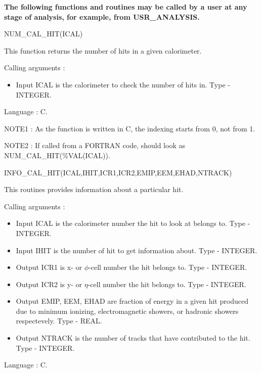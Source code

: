 \bigskip

{\bf The following functions and routines may be called by a user at any stage 
of analysis, for example, from USR\_ANALYSIS.}

\bigskip

\begin{center}
NUM\_CAL\_HIT(ICAL)
\end{center}

This function returns the number of hits in a given calorimeter. 

\newpage

Calling arguments :
\begin{itemize}
\item {Input ICAL is the calorimeter to check the number of hits in. Type - INTEGER.}
\end{itemize}

Language : C.

NOTE1 : As the function is written in C, the indexing starts from 0, not from 1.

NOTE2 : If called from a FORTRAN code, should look as NUM\_CAL\_HIT(\%VAL(ICAL)).

\bigskip

\begin{center}
INFO\_CAL\_HIT(ICAL,IHIT,ICR1,ICR2,EMIP,EEM,EHAD,NTRACK)
\end{center}

This routines provides information about a particular hit.

Calling arguments :
\begin{itemize}
\item {Input ICAL is the calorimeter number the hit to look at
belongs to. Type - INTEGER.}
\item {Input IHIT is the number of hit to get information about. Type - INTEGER.}
\item {Output ICR1 is x- or $\phi$-cell number the hit belongs to. Type - INTEGER.}
\item {Output ICR2 is y- or $\eta$-cell number the hit belongs to. Type - INTEGER.}
\item {Output EMIP, EEM, EHAD are fraction of energy in a given hit
produced due to minimum ionizing, electromagnetic showers, or hadronic showers respectevely. 
Type - REAL.}
\item {Output NTRACK is the number of tracks that have
contributed to the hit. Type - INTEGER.}
\end{itemize}

Language : C.

